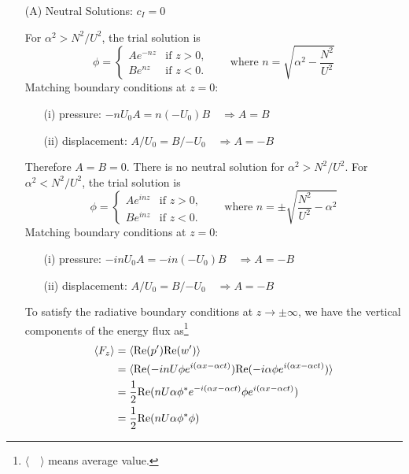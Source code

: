 \begin{enumerate}
\item[(A)] Neutral Solutions: $c_I=0$

For $\alpha^2>N^2/U^2$, the trial solution is
\begin{equation}\label{str:tr1}
\phi =
\begin{cases}
Ae^{-nz} &\text{if $z>0$,}\\
Be^{nz} &\text{if $z<0$.}
\end{cases}
\qquad \text{where }n=\sqrt{\alpha^2-\frac{N^2}{U^2}}
\end{equation}
Matching boundary conditions at $z=0$:
\begin{enumerate}
  \item[(i)] pressure: $-nU_0A=n(-U_0)B \quad\Rightarrow A=B$
  \item[(ii)] displacement: $A/U_0=B/{-U_0} \quad\Rightarrow A={-B}$
\end{enumerate}
Therefore $A=B=0$. There is no neutral solution for
$\alpha^2>N^2/U^2$.
\newslide
For $\alpha^2<N^2/U^2$, the trial solution is
\begin{equation}\label{str:tr2}
\phi =
\begin{cases}
Ae^{inz} &\text{if $z>0$,}\\
Be^{inz} &\text{if $z<0$.}
\end{cases}
\qquad \text{where }n=\pm\sqrt{\frac{N^2}{U^2}-\alpha^2}
\end{equation}
Matching boundary conditions at $z=0$:
\begin{enumerate}
  \item[(i)] pressure: $-inU_0A=-in(-U_0)B \quad\Rightarrow A={-B}$
  \item[(ii)] displacement: $A/U_0=B/{-U_0} \quad\Rightarrow A={-B}$
\end{enumerate}
\newslide
To satisfy the radiative boundary conditions at $z \to \pm\infty$,
we have the vertical components of the energy flux
as\footnote{$\langle\quad\rangle$ means average value.}
\begin{align}
    \langle F_z\rangle&=\langle\text{Re}(p')\text{Re}(w')\rangle\notag\\
    &=\langle\text{Re}(-inU\phi e^{i(\alpha x-\alpha c t)})\text{Re}(-i\alpha\phi e^{i(\alpha x-\alpha c t)})\rangle\notag\\
    &=\frac{1}{2}\text{Re}(nU\alpha\phi^*e^{-i(\alpha x-\alpha c t)}\phi e^{i(\alpha x-\alpha c t)})\notag\\
    &=\frac{1}{2}\text{Re}(nU\alpha\phi^*\phi)\notag\\

\end{align}
\end{enumerate}
